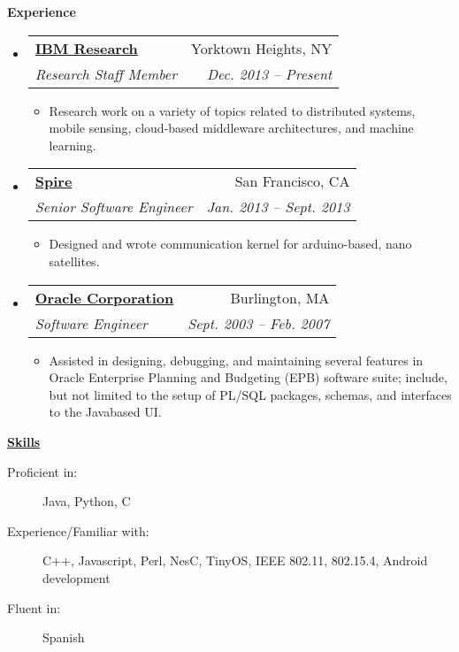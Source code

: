 \documentclass[letterpaper,11pt]{article}
\makeatletter
\newcommand{\resitem}[1]{\item #1 \vspace{-2pt}}
\newcommand{\resheading}[1]{{\large \colorbox{mygrey}{\begin{minipage}{\textwidth}{\textbf{#1 \vphantom{p\^{E}}}}\end{minipage}}}}
\newcommand{\ressubheading}[4]{
\begin{tabular*}{6.5in}{l@{\extracolsep{\fill}}r}
		\textbf{#1} & #2 \\
		\textit{#3} & \textit{#4} \\
\end{tabular*}\vspace{-6pt}}
\makeatother
\begin{document}
\resheading{Experience}
	\begin{itemize}

        \item 
			\ressubheading{\href{http://www.research.ibm.com/}{IBM Research}}{Yorktown Heights, NY}
				{Research Staff Member}{Dec. 2013 -- Present}
				{ \footnotesize
				\begin{itemize}
                    \resitem{Research work on a variety of topics related to distributed systems, mobile sensing, cloud-based middleware architectures, and machine learning. }
				\end{itemize}
				}


        \item 
			\ressubheading{\href{https://spire.com/}{Spire}}{San Francisco, CA}
				{Senior Software Engineer}{Jan. 2013 -- Sept. 2013}
				{ \footnotesize
				\begin{itemize}
                    \resitem{Designed and wrote communication kernel for arduino-based, nano satellites.}
				\end{itemize}
				}

		\item 
			\ressubheading{\href{http://www.oracle.com}{Oracle Corporation}}{Burlington, MA}
				{Software Engineer}{Sept. 2003 -- Feb. 2007}
				{ \footnotesize
				\begin{itemize}
                    \resitem{Assisted in designing, debugging, and maintaining several features in Oracle Enterprise Planning and Budgeting (EPB) software suite; include, but not limited to the setup of PL/SQL packages, schemas, and interfaces to the Java\-based UI.}
				\end{itemize}
				}

				
		
\end{itemize}  %

\resheading{\href{http://www.derekhildreth.com/portfolio.php}{Skills}}
	\begin{description}
		\item[Proficient in:]{Java, Python, C
		}
		\item[Experience/Familiar with:]{ \footnotesize
            C++, Javascript, Perl, NesC, TinyOS,
            IEEE 802.11, 802.15.4, Android development
		}
        \item[Fluent in:] { \footnotesize
            Spanish
		}
	\end{description} %
\end{document}
